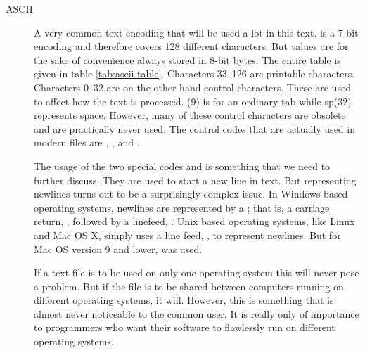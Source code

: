 \begin{description}
\item[ASCII] A very common text encoding that will be used a lot in
  this text. \ascii is a \mbox{7-bit} encoding and therefore covers
  128 different characters. But \ascii values are for the sake of
  convenience always stored in 8-bit bytes. The entire \ascii table is
  given in table \ref{tab:ascii-table}\cite{rfc20}. Characters 33--126
  are printable characters. Characters 0--32 are on the other hand
  control characters. These are used to affect how the text is
  processed. \htab(9) is for an ordinary tab while {\acronymstyle
    sp}(32) represents space. However, many of these control
  characters are obsolete and are practically never used. The control
  codes that are actually used in modern files are \nul, \htab, \lf
  and \cret \cite{maini2007digital}.

  The usage of the two special codes \cret and \lf is something that
  we need to further discuss. They are used to start a new line in
  text. But representing newlines turns out to be a surprisingly
  complex issue. In Windows based operating systems, newlines are
  represented by a \crlf; that is, a carriage return, \cret, followed
  by a linefeed, \lf. Unix based operating systems, like Linux and Mac
  OS X, simply uses a line feed, \lf, to represent newlines. But for
  Mac OS version 9 and lower, \cret was
  used\cite{robbins:_common_newline,noria:_under_newlin_oreilly,editor:_end_line_story_rfc,tancig01:_apart_no_more_newline,corporation08:_creat_telep_applic_both_window_linux}.

  If a text file is to be used on only one operating system this will
  never pose a problem. But if the file is to be shared between
  computers running on different operating systems, it will. However,
  this is something that is almost never noticeable to the common
  user. It is really only of importance to programmers who want their
  software to flawlessly run on different operating systems.


\end{description}
